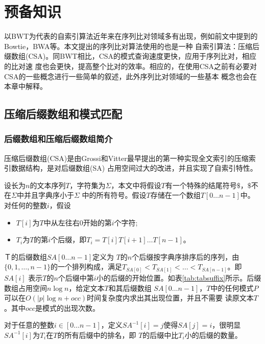 \chapter{预备知识}
\label{chap:predefine}

以BWT为代表的自索引算法近年来在序列比对领域多有出现，例如前文中提到的Bowtie，BWA等。本文提出的序列比对算法使用的也是一种
自索引算法：压缩后缀数组(CSA)\cite{grossi2005compressed}。同BWT相比，CSA的模式查询速度更快，应用于序列比对，相应的比对速
度也会更快，提高整个比对的效率。相应的，在使用CSA之前有必要对CSA的一些概念进行一些简单的叙述，此外序列比对领域的一些基本
概念也会在本章中解释。

\section{压缩后缀数组和模式匹配}

\subsection{后缀数组和压缩后缀数组简介}
压缩后缀数组(CSA)是由Grossi和Vitter\cite{grossi2005compressed}最早提出的第一种实现全文索引的压缩索引数据结构，是对后缀数组(SA)
\cite{manber1993suffix}占用空间过大的改进，并且实现了自索引特性。

设长为$n$的文本序列$T$，字符集为$\Sigma$，本文中将假设$T$有一个特殊的结尾符号$\$$，$\$$不在$\Sigma$中并且字典序小于$\Sigma$
中的所有符号。假设$T$存储在一个数组$T[0\ldots n-1]$中。对任何的整数$i$，假设
\begin{itemize}
    \item $T[i]$为$T$中从左往右0开始的第$i$个字符;
    \item $T_i$为$T$的第$i$个后缀，即$T_i=T[i]T[i+1]\ldots T[n-1]$。
\end{itemize}

$Ｔ$的后缀数组$SA[0\ldots n-1]$定义为
$T$的$n$个后缀按字典序排序后的序列，由$\{0,1,\ldots, n-1\}$的一个排列构成，满足$T_{SA[0]}<T_{SA[1]}<\ldots<T_{SA[n-1]}$。即$SA[i]$
表示$T$的$n$个后缀中第$i$小的后缀的开始位置。如表\ref{tab:tabsuffix}所示。后缀数组占用空间$n\log n$，给定文本$T$和其后缀数组
$SA[0\ldots n-1]$，$T$中的任何模式$P$可以在$O(|p|\log n+occ)$时间复杂度内求出其出现位置\cite{manber1993suffix}，并且不需要
读原文本$T$。其中$occ$是模式的出现次数。

对于任意的整数$i \in [0\ldots n-1]$，定义$SA^{-1}[i]=j$使得$SA[j]=i$，很明显$SA^{-1}[i]$为$T_i$在$T$的所有后缀中的排名，即
$T$的后缀中比$T_i$小的后缀的数量。

